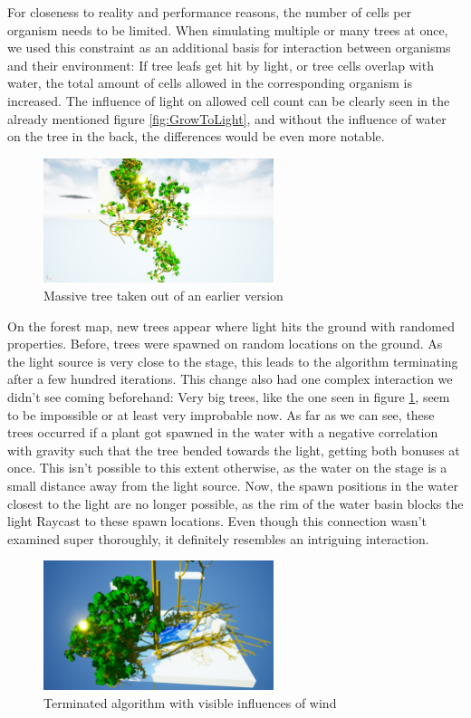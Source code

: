 \documentclass[11pt]{scrartcl}
\begin{document}
For closeness to reality and performance reasons, the number of cells per organism needs to be limited. When simulating multiple or many trees at once, we used this constraint as an additional basis for interaction between organisms and their environment: If tree leafs get hit by light, or tree cells overlap with water, the total amount of cells allowed in the corresponding organism is increased. The influence of light on allowed cell count can be clearly seen in the already mentioned figure \ref{fig:GrowToLight}, and without the influence of water on the tree in the back, the differences would be even more notable.

\begin{figure}
 	 \centering
 	    \includegraphics[width=0.6\textwidth]{SS_BIGTree.png}
 	 \caption{Massive tree taken out of an earlier version}
 	 \label{fig:BIGTree}
\end{figure}

On the forest map, new trees appear where light hits the ground with randomed properties. Before, trees were spawned on random locations on the ground. As the light source is very close to the stage, this leads to the algorithm terminating after a few hundred iterations. This change also had one complex interaction we didn't see coming beforehand: Very big trees, like the one seen in figure \ref{fig:BIGTree}, seem to be impossible or at least very improbable now. As far as we can see, these trees occurred if a plant got spawned in the water with a negative correlation with gravity such that the tree bended towards the light, getting both bonuses at once. This isn't possible to this extent otherwise, as the water on the stage is a small distance away from the light source. Now, the spawn positions in the water closest to the light are no longer possible, as the rim of the water basin blocks the light Raycast to these spawn locations. Even though this connection wasn't examined super thoroughly, it definitely resembles an intriguing interaction.

\begin{figure}
 	 \centering
 	    \includegraphics[width=0.6\textwidth]{SS_StageWithWind.png}
 	 \caption{Terminated algorithm with visible influences of wind}
 	 \label{fig:StageWind}
\end{figure}
\end{document}
